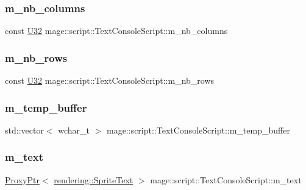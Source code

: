 \subsubsection{\texorpdfstring{m\+\_\+nb\+\_\+columns}{m\_nb\_columns}}
{\footnotesize\ttfamily const \hyperlink{namespacemage_a41c104c036fba3756a74e19f793eeaa1}{U32} mage\+::script\+::\+Text\+Console\+Script\+::m\+\_\+nb\+\_\+columns\hspace{0.3cm}{\ttfamily [private]}}

\hypertarget{classmage_1_1script_1_1_text_console_script_a9d00451cf1cf319512e0c88352d22911}{}\label{classmage_1_1script_1_1_text_console_script_a9d00451cf1cf319512e0c88352d22911} 
\subsubsection{\texorpdfstring{m\+\_\+nb\+\_\+rows}{m\_nb\_rows}}
{\footnotesize\ttfamily const \hyperlink{namespacemage_a41c104c036fba3756a74e19f793eeaa1}{U32} mage\+::script\+::\+Text\+Console\+Script\+::m\+\_\+nb\+\_\+rows\hspace{0.3cm}{\ttfamily [private]}}

\hypertarget{classmage_1_1script_1_1_text_console_script_ae62bf3d6f88f297eb37892d507d8a032}{}\label{classmage_1_1script_1_1_text_console_script_ae62bf3d6f88f297eb37892d507d8a032} 
\subsubsection{\texorpdfstring{m\+\_\+temp\+\_\+buffer}{m\_temp\_buffer}}
{\footnotesize\ttfamily std\+::vector$<$ wchar\+\_\+t $>$ mage\+::script\+::\+Text\+Console\+Script\+::m\+\_\+temp\+\_\+buffer\hspace{0.3cm}{\ttfamily [private]}}

\hypertarget{classmage_1_1script_1_1_text_console_script_ae36b6e921f3e44488baa62df3d283210}{}\label{classmage_1_1script_1_1_text_console_script_ae36b6e921f3e44488baa62df3d283210} 
\subsubsection{\texorpdfstring{m\+\_\+text}{m\_text}}
{\footnotesize\ttfamily \hyperlink{classmage_1_1_proxy_ptr}{Proxy\+Ptr}$<$ \hyperlink{classmage_1_1rendering_1_1_sprite_text}{rendering\+::\+Sprite\+Text} $>$ mage\+::script\+::\+Text\+Console\+Script\+::m\+\_\+text\hspace{0.3cm}{\ttfamily [private]}}


